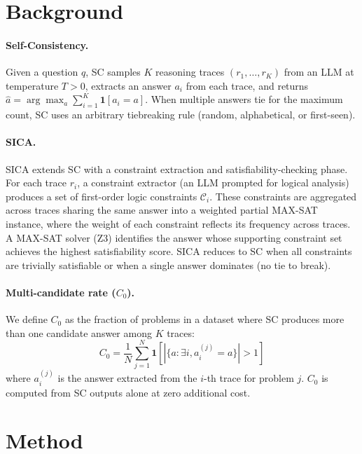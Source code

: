 \documentclass[11pt,a4paper]{article}
\begin{document}
\section{Background}
\label{sec:background}

\paragraph{Self-Consistency.}
Given a question $q$, SC samples $K$ reasoning traces $(r_1, \dots, r_K)$ from an LLM at temperature $T>0$, extracts an answer $a_i$ from each trace, and returns $\hat{a} = \arg\max_a \sum_{i=1}^{K} \mathbf{1}[a_i = a]$.
When multiple answers tie for the maximum count, SC uses an arbitrary tiebreaking rule (random, alphabetical, or first-seen).

\paragraph{SICA.}
SICA extends SC with a constraint extraction and satisfiability-checking phase.
For each trace $r_i$, a constraint extractor (an LLM prompted for logical analysis) produces a set of first-order logic constraints $\mathcal{C}_i$.
These constraints are aggregated across traces sharing the same answer into a weighted partial MAX-SAT instance, where the weight of each constraint reflects its frequency across traces.
A MAX-SAT solver (Z3) identifies the answer whose supporting constraint set achieves the highest satisfiability score.
SICA reduces to SC when all constraints are trivially satisfiable or when a single answer dominates (no tie to break).

\paragraph{Multi-candidate rate ($C_0$).}
We define $C_0$ as the fraction of problems in a dataset where SC produces more than one candidate answer among $K$ traces:
\begin{equation}
C_0 = \frac{1}{N} \sum_{j=1}^{N} \mathbf{1}\left[|\{a : \exists i, a_i^{(j)} = a\}| > 1\right]
\end{equation}
where $a_i^{(j)}$ is the answer extracted from the $i$-th trace for problem $j$.
$C_0$ is computed from SC outputs alone at zero additional cost.

\section{Method}
\label{sec:method}
\end{document}
